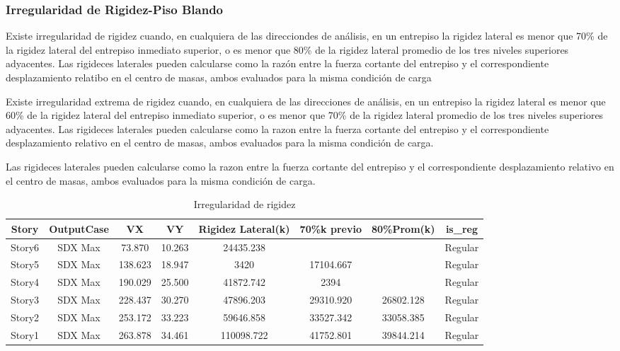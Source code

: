 \documentclass{article}%
\begin{document}
%
\subsubsection{Irregularidad de Rigidez-Piso Blando}%
\label{ssubsec:IrregularidaddeRigidez{-}PisoBlando}%
\begin{tcolorbox}[colback=gray!5!white,colframe=cyan!75!black,fonttitle=\bfseries,title=Tabla N°9 E-030]%
Existe irregularidad de rigidez cuando, en cualquiera de las direcciondes de análisis, en un entrepiso la rigidez lateral es menor que 70\% de la rigidez lateral del entrepiso inmediato superior, o es menor que 80\% de la rigidez lateral promedio de los tres niveles superiores adyacentes. 
 Las rigideces laterales pueden calcularse como la razón entre la fuerza cortante del entrepiso y el correspondiente desplazamiento relatibo en el centro de masas, ambos evaluados para la misma condición de carga %
\end{tcolorbox}%
\begin{tcolorbox}[colback=gray!5!white,colframe=cyan!75!black,fonttitle=\bfseries,title=Tabla N°9 E-030]%

Existe irregularidad extrema de rigidez cuando, en cualquiera de las direcciones de análisis, en un entrepiso la rigidez lateral es menor que 60\% de la rigidez lateral del entrepiso inmediato superior, o es menor que 70\% de la rigidez lateral promedio de los tres niveles superiores adyacentes.
Las rigideces laterales pueden calcularse como la razon entre la fuerza cortante del entrepiso y el correspondiente desplazamiento relativo en el centro de masas, ambos evaluados para la misma condición de carga.%
\end{tcolorbox}%
Las rigideces laterales pueden calcularse como la razon entre la fuerza cortante del entrepiso y el correspondiente desplazamiento relativo en el centro de masas, ambos evaluados para la misma condición de carga. \newline%
%


\begin{table}[h!]%
\centering%
\caption{Irregularidad de rigidez}%
\begin{tabular}{cccccccc}
\toprule
Story & OutputCase & VX & VY & Rigidez Lateral(k) & 70\%k previo & 80\%Prom(k) & is\_reg \\
\midrule
Story6 & SDX Max & 73.870 & 10.263 & 24435.238 &  &  & Regular \\
Story5 & SDX Max & 138.623 & 18.947 & 3420 & 17104.667 &  & Regular \\
Story4 & SDX Max & 190.029 & 25.500 & 41872.742 & 2394 &  & Regular \\
Story3 & SDX Max & 228.437 & 30.270 & 47896.203 & 29310.920 & 26802.128 & Regular \\
Story2 & SDX Max & 253.172 & 33.223 & 59646.858 & 33527.342 & 33058.385 & Regular \\
Story1 & SDX Max & 263.878 & 34.461 & 110098.722 & 41752.801 & 39844.214 & Regular \\
\bottomrule
\end{tabular}
%
\end{table}
\end{document}
